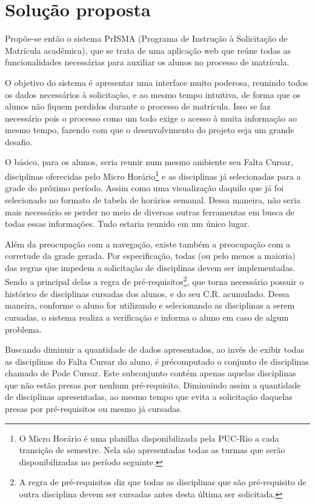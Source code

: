 \documentclass[graduacao,brazil]{ThesisPUC}
\begin{document}

\chapter{Solução proposta}

Propõe-se então o sistema PrISMA (Programa de Instrução à Solicitação de Matrícula acadêmica), que se trata de uma aplicação web que reúne todas as funcionalidades necessárias para auxiliar os alunos no processo de matrícula.

O objetivo do sistema é apresentar uma interface muito poderosa, reunindo todos os dados necessários à solicitação, e ao mesmo tempo intuitiva, de forma que os alunos não fiquem perdidos durante o processo de matrícula. Isso se faz necessário pois o processo como um todo exige o acesso à muita informação ao mesmo tempo, fazendo com que o desenvolvimento do projeto seja um grande desafio.

O básico, para os alunos, seria reunir num mesmo ambiente seu Falta Cursar, disciplinas oferecidas pelo Micro Horário\footnote{O Micro Horário é uma planilha disponibilizada pela PUC-Rio a cada transição de semestre. Nela são apresentadas todas as turmas que serão disponibilizadas no período seguinte.} e as disciplinas já selecionadas para a grade do próximo período. Assim como uma visualização daquilo que já foi selecionado no formato de tabela de horários semanal. Dessa maneira, não seria mais necessário se perder no meio de diversas outras ferramentas em busca de todas essas informações. Tudo estaria reunido em um único lugar.

Além da preocupação com a navegação, existe também a preocupação com a corretude da grade gerada. Por especificação, todas (ou pelo menos a maioria) das regras que impedem a solicitação de disciplinas devem ser implementadas. Sendo a principal delas a regra de pré-requisitos\footnote{A regra de pré-requisitos diz que todas as disciplinas que são pré-requisito de outra disciplina devem ser cursadas antes desta última ser solicitada.}, que torna necessário possuir o histórico de disciplinas cursadas dos alunos, e do seu C.R. acumulado. Dessa maneira, conforme o aluno for utilizando e selecionando as disciplinas a serem cursadas, o sistema realiza a verificação e informa o aluno em caso de algum problema.

Buscando diminuir a quantidade de dados apresentados, ao invés de exibir todas as disciplinas do Falta Cursar do aluno, é précomputado o conjunto de disciplinas chamado de Pode Cursar. Este subconjunto contém apenas aquelas disciplinas que não estão presas por nenhum pré-requisito. Diminuindo assim a quantidade de disciplinas apresentadas, ao mesmo tempo que evita a solicitação daquelas presas por pré-requisitos ou mesmo já cursadas.
\end{document}
